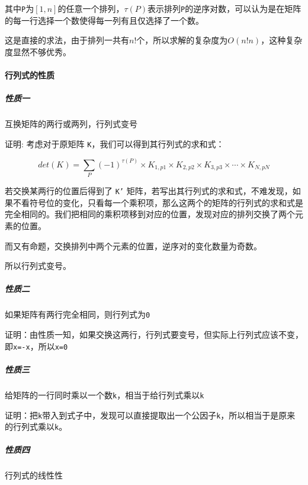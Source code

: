 \documentclass[UTF-8]{ctexart}
\begin{document}
	其中\texttt{P}为$[1,n]$的任意一个排列，$\tau(P)$表示排列\texttt{P}的逆序对数，可以认为是在矩阵的每一行选择一个数使得每一列有且仅选择了一个数。
	  
	这是直接的求法，由于排列一共有$n!$个，所以求解的复杂度为$O(n!n)$，这种复杂度显然不够优秀。
	
	\paragraph{行列式的性质}
	\subparagraph{性质一} 互换矩阵的两行或两列，行列式变号
	
	证明:	考虑对于原矩阵 \texttt{K}，我们可以得到其行列式的求和式：  
	
	$$det(K)=\sum _ {P}{(-1)}^{\tau{(P)}}\times{K} _ {1,p1}\times{K} _ {2,p2}\times{K} _ {3,p3}\times\cdots\times{K} _ {N,pN}$$
	
	若交换某两行的位置后得到了 \texttt{K'} 矩阵，若写出其行列式的求和式，不难发现，如果不看符号位的变化，只看每一个乘积项，那么这两个的矩阵的行列式的求和式是完全相同的。我们把相同的乘积项移到对应的位置，发现对应的排列交换了两个元素的位置。
	
	而又有命题，交换排列中两个元素的位置，逆序对的变化数量为奇数。  
	
	所以行列式变号。
	
	\subparagraph{性质二} 如果矩阵有两行完全相同，则行列式为\texttt{0}
	
	证明：由性质一知，如果交换这两行，行列式要变号，但实际上行列式应该不变，即\texttt{x=-x}，所以\texttt{x=0}
	
	\subparagraph{性质三} 给矩阵的一行同时乘以一个数\texttt{k}，相当于给行列式乘以\texttt{k}
	
	证明：把\texttt{k}带入到式子中，发现可以直接提取出一个公因子\texttt{k}，所以相当于是原来的行列式乘以\texttt{k}。
	
	\subparagraph{性质四} 行列式的线性性
	
\end{document}
